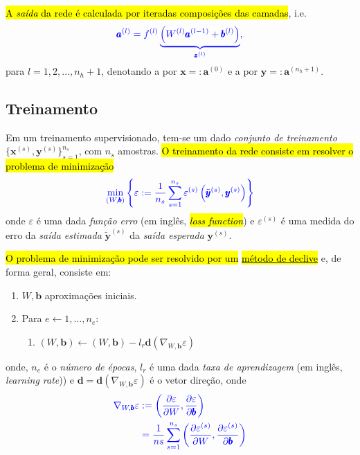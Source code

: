 \hl{A \emph{saída} da rede é calculada por iteradas composições das camadas}, i.e.
\begin{equation}\color{blue}\pmb{a}^{(l)} = f^{(l)}\underbrace{\left(W^{(l)}\pmb{a}^{(l-1)} + \pmb{b}^{(l)}\right)}_{\pmb{z}^{(l)}},
\end{equation}
para $l= 1, 2, \dotsc, n_h+1$, denotando a  por $\pmb{x} =: \pmb{a}^{(0)}$ e a  por $\pmb{y} =: \pmb{a}^{(n_h+1)}$.

\subsection{Treinamento}\label{cap_mlp_sec_modelo:ssec:treinamento}

Em um treinamento supervisionado, tem-se um dado \emph{conjunto de treinamento} $\{\pmb{x}^{(s)}, \pmb{y}^{(s)}\}_{s=1}^{n_s}$, com $n_s$ amostras. \hl{O treinamento da rede consiste em resolver o problema de minimização}
\begin{equation}\color{blue}\min_{(W,\pmb{b})}\left\{\varepsilon := \frac{1}{n_s}\sum_{s=1}^{n_s} \varepsilon^{(s)}\left(\tilde{\pmb{y}}^{(s)}, \pmb{y}^{(s)}\right)\right\}
\end{equation}
onde $\varepsilon$ é uma dada \emph{função erro} (em inglês, \hl{\textit{loss function}}) e $\varepsilon^{(s)}$ é uma medida do erro da \emph{saída estimada} $\tilde{\pmb{y}}^{(s)}$ da \emph{saída esperada} $\pmb{y}^{(s)}$.

\hl{O problema de minimização pode ser resolvido por um }\href{https://notaspedrok.com.br/notas/MatematicaNumericaAvancada/cap\_otimizacao_sec_minimi.html}{\hl{método de declive}} e, de forma geral, consiste em:
\begin{enumerate}
\item $W, \pmb{b}$ aproximações iniciais.
\item Para $e\leftarrow 1, \dotsc, n_e$:
  \begin{enumerate}\hleq
  \item $\displaystyle (W, \pmb{b}) \leftarrow (W, \pmb{b}) - l_r\pmb{d}\left(\nabla_{W,\pmb{b}} \varepsilon\right)$
  \end{enumerate}
\end{enumerate}
onde, $n_e$ é o \emph{número de épocas}, $l_r$ é uma dada \emph{taxa de aprendizagem} (em inglês, \textit{learning rate})) e $\pmb{d} = \pmb{d}\left(\nabla_{W,\pmb{b}} \varepsilon\right)$ é o vetor direção, onde
\begin{align}
  \color{blue}\nabla_{W, \pmb{b}} \varepsilon &\color{blue}:= \left(\frac{\partial\varepsilon}{\partial W}, \frac{\partial\varepsilon}{\partial\pmb{b}}\right)\\
  &\color{blue}= \frac{1}{ns}\sum_{s=1}^{n_s}\left(\frac{\partial\varepsilon^{(s)}}{\partial W}, \frac{\partial\varepsilon^{(s)}}{\partial\pmb{b}}\right)
\end{align}

